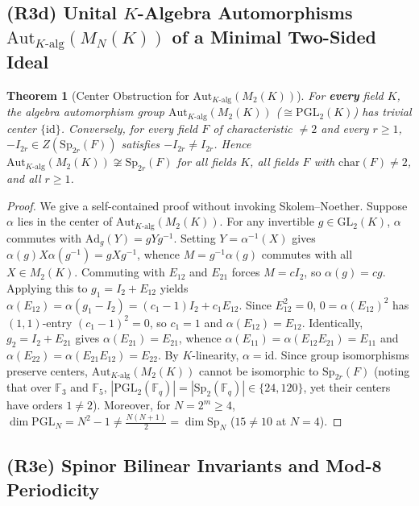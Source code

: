 \documentclass[11pt,a4paper]{article}
\newtheorem{theorem}{Theorem}[section]
\theoremstyle{definition}
\newcommand{\Aut}{\mathrm{Aut}}
\newcommand{\GL}{\mathrm{GL}}
\newcommand{\PGL}{\mathrm{PGL}}
\newcommand{\Sp}{\mathrm{Sp}}
\newcommand{\id}{\mathrm{id}}
\begin{document}
\subsection{(R3d) Unital \texorpdfstring{$K$}{K}-Algebra Automorphisms \texorpdfstring{$\Aut_{K\text{-alg}}(M_N(K))$}{Aut\_(K-alg)(M\_N(K))} of a Minimal Two-Sided Ideal}

\begin{theorem}[Center Obstruction for $\Aut_{K\text{-alg}}(M_2(K))$]\label{thm:twosided_aut}
For \textbf{every} field $K$, the algebra automorphism group $\Aut_{K\text{-alg}}(M_2(K))$ ($\cong \PGL_2(K)$) has trivial center $\{\id\}$. Conversely, for every field $F$ of characteristic $\neq 2$ and every $r \ge 1$, $-I_{2r} \in Z(\Sp_{2r}(F))$ satisfies $-I_{2r} \neq I_{2r}$. Hence $\Aut_{K\text{-alg}}(M_2(K)) \not\cong \Sp_{2r}(F)$ for all fields $K$, all fields $F$ with $\mathrm{char}(F) \neq 2$, and all $r \ge 1$.
\end{theorem}

\begin{proof}
We give a self-contained proof without invoking Skolem--Noether. Suppose $\alpha$ lies in the center of $\Aut_{K\text{-alg}}(M_2(K))$. For any invertible $g \in \GL_2(K)$, $\alpha$ commutes with $\mathrm{Ad}_g(Y) = g Y g^{-1}$. Setting $Y = \alpha^{-1}(X)$ gives $\alpha(g) X \alpha(g^{-1}) = g X g^{-1}$, whence $M = g^{-1}\alpha(g)$ commutes with all $X \in M_2(K)$. Commuting with $E_{12}$ and $E_{21}$ forces $M = c I_2$, so $\alpha(g) = c g$. Applying this to $g_1 = I_2 + E_{12}$ yields $\alpha(E_{12}) = \alpha(g_1 - I_2) = (c_1 - 1)I_2 + c_1 E_{12}$. Since $E_{12}^2 = 0$, $0 = \alpha(E_{12})^2$ has $(1,1)$-entry $(c_1 - 1)^2 = 0$, so $c_1 = 1$ and $\alpha(E_{12}) = E_{12}$. Identically, $g_2 = I_2 + E_{21}$ gives $\alpha(E_{21}) = E_{21}$, whence $\alpha(E_{11}) = \alpha(E_{12}E_{21}) = E_{11}$ and $\alpha(E_{22}) = \alpha(E_{21}E_{12}) = E_{22}$. By $K$-linearity, $\alpha = \id$. Since group isomorphisms preserve centers, $\Aut_{K\text{-alg}}(M_2(K))$ cannot be isomorphic to $\Sp_{2r}(F)$ (noting that over $\mathbb{F}_3$ and $\mathbb{F}_5$, $|\PGL_2(\mathbb{F}_q)| = |\Sp_2(\mathbb{F}_q)| \in \{24, 120\}$, yet their centers have orders $1 \neq 2$). Moreover, for $N = 2^m \ge 4$, $\dim \PGL_N = N^2 - 1 \neq \frac{N(N+1)}{2} = \dim \Sp_N$ ($15 \neq 10$ at $N = 4$).
\end{proof}

\subsection{(R3e) Spinor Bilinear Invariants and Mod-8 Periodicity}
\end{document}
